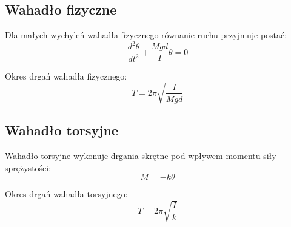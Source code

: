 \documentclass{article}
\begin{document}
\subsection{Wahadło fizyczne}
Dla małych wychyleń wahadła fizycznego równanie ruchu przyjmuje postać:
\begin{equation}
    \frac{d^2 \theta}{dt^2} + \frac{M g d}{I} \theta = 0
\end{equation}

Okres drgań wahadła fizycznego:
\begin{equation}
    T = 2\pi \sqrt{\frac{I}{M g d}}
\end{equation}

\subsection{Wahadło torsyjne}
Wahadło torsyjne wykonuje drgania skrętne pod wpływem momentu siły sprężystości:
\begin{equation}
    M = -k\theta
\end{equation}

Okres drgań wahadła torsyjnego:
\begin{equation}
    T = 2\pi \sqrt{\frac{I}{k}}
\end{equation}
\end{document}
